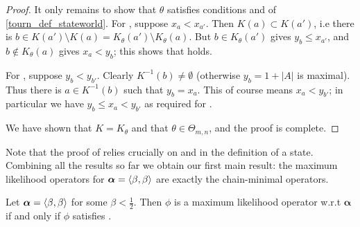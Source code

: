 \begin{proof}
    It only remains to show that $\theta$ satisfies conditions
     and  of
    \cref{tourn_def_stateworld}. For , suppose $x_a
    < x_{a'}$. Then $K(a) \subset K(a')$, i.e there is $b \in K(a') \setminus
    K(a) = K_\theta(a') \setminus K_\theta(a)$. But $b \in K_\theta(a')$ gives
    $y_b \le x_{a'}$, and $b \not\in K_\theta(a)$ gives $x_a < y_b$; this shows
    that  holds.

    For , suppose $y_b < y_{b'}$. Clearly
    $K^{-1}(b) \ne \emptyset$ (otherwise $y_b = 1 + |A|$ is maximal). Thus
    there is $a \in K^{-1}(b)$ such that $y_b = x_a$. This of course means $x_a
    < y_{b'}$; in particular we have $y_b \le x_a < y_{b'}$ as required for
    .

    We have shown that $K = K_\theta$ and that $\theta \in \Theta_{m,n}$, and the
    proof is complete.
\end{proof}

Note that the proof of  relies crucially on
 and
 in the definition of a state. Combining
all the results so far we obtain our first main result: the maximum likelihood
operators for $\bm{\alpha} = \langle{\beta,\beta}\rangle$ are exactly the chain-minimal
operators.

\begin{theorem}
   \label{tourn_result_mle_iff_chainmin_operator}
   Let $\bm{\alpha} = \langle{\beta, \beta}\rangle$ for some $\beta < \frac{1}{2}$.
   Then $\phi$ is a maximum likelihood operator w.r.t $\bm{\alpha}$
   if and only if $\phi$ satisfies .
\end{theorem}

